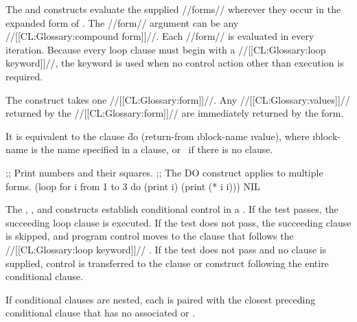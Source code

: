 \endsubsection%

 
  The  and  constructs  evaluate the  supplied //forms//  wherever they occur in the expanded form of .
 The //form// argument can be any //[[CL:Glossary:compound form]]//. Each //form// is evaluated in every iteration. Because every loop clause must begin with a //[[CL:Glossary:loop keyword]]//,  the keyword  is used when no control action other than execution is  required.
 


 The  construct takes one //[[CL:Glossary:form]]//. 
 Any //[[CL:Glossary:values]]// returned by the //[[CL:Glossary:form]]// 
 are immediately returned by the  form.

  It is equivalent to the clause
  \f{do (return-from \i{block-name} \i{value})},
  where \i{block-name} is the name specified in a 
  clause, or \nil\ if there is no  clause.


\code ;; Print numbers and their squares. ;; The DO construct applies to multiple forms.
 (loop for i from 1 to 3
       do (print i)
          (print (* i i)))             \EV NIL

\endcode

\endsubsubsection%

\endsubsection%

 


The , , and  constructs establish conditional control in a . If the test passes, the succeeding loop clause is executed. If the test does not pass, the succeeding clause is skipped, and program control moves to the clause that follows the //[[CL:Glossary:loop keyword]]// . If the test does not pass and no  clause is supplied, control is transferred to the clause or construct following the entire conditional clause.

If conditional clauses are nested, each  is paired with the closest preceding conditional clause that has no associated  or . 

